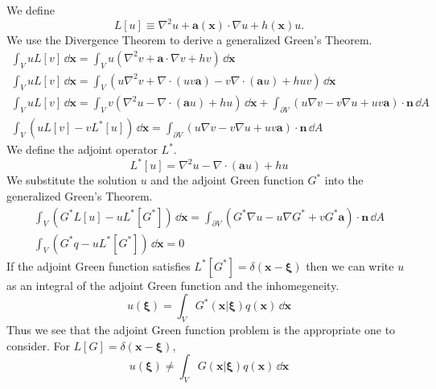 {\begin{Solution}
  We define
  \[
  L[u] \equiv \nabla^2 u + \mathbf{a}(\mathbf{x}) \cdot \nabla u + h(\mathbf{x}) u.
  \]
  We use the Divergence Theorem to derive a generalized Green's Theorem.
  \begin{gather*}
    \int_V u L[v] \,\dd \mathbf{x}
    = \int_V u ( \nabla^2 v + \mathbf{a} \cdot \nabla v + h v ) \,\dd \mathbf{x}
    \\
    \int_V u L[v] \,\dd \mathbf{x}
    = \int_V ( u \nabla^2 v + \nabla \cdot ( u v \mathbf{a} ) - v \nabla \cdot ( \mathbf{a} u ) 
    + h u v  ) \,\dd \mathbf{x}
    \\
    \int_V u L[v] \,\dd \mathbf{x}
    = \int_V v ( \nabla^2 u - \nabla \cdot ( \mathbf{a} u ) + h u ) \,\dd \mathbf{x}
    + \int_{\partial V} ( u \nabla v - v \nabla u + u v \mathbf{a} ) \cdot \mathbf{n} \,\dd A
    \\
    \int_V ( u L[v] - v L^*[u] )\,\dd \mathbf{x}
    = \int_{\partial V} ( u \nabla v - v \nabla u + u v \mathbf{a} ) \cdot \mathbf{n} \,\dd A
  \end{gather*}
  We define the adjoint operator $L^*$.
  \[
  L^*[u] = \nabla^2 u - \nabla \cdot ( \mathbf{a} u ) + h u
  \]
  We substitute the solution $u$ and the adjoint Green function $G^*$ into the 
  generalized Green's Theorem.
  \begin{gather*}
    \int_V ( G^* L[u] - u L^*[G^*] )\,\dd \mathbf{x}
    = \int_{\partial V} ( G^* \nabla u - u \nabla G^* + v G^* \mathbf{a} ) \cdot \mathbf{n} \,\dd A
    \\
    \int_V ( G^* q - u L^*[G^*] )\,\dd \mathbf{x} = 0
  \end{gather*}
  If the adjoint Green function satisfies 
  $L^*[G^*] = \delta(\mathbf{x} - \boldsymbol{\xi})$ then
  we can write $u$ as an integral of the adjoint Green function and the 
  inhomegeneity.
  \[
  u(\boldsymbol{\xi}) = \int_V G^*(\mathbf{x}|\boldsymbol{\xi}) q(\mathbf{x}) 
  \,\dd \mathbf{x}
  \]
  Thus we see that the adjoint Green function problem is the appropriate one 
  to consider.  For $L[G] = \delta(\mathbf{x} - \boldsymbol{\xi})$, 
  \[
  u(\boldsymbol{\xi}) \neq \int_V G(\mathbf{x}|\boldsymbol{\xi}) q(\mathbf{x}) 
  \,\dd \mathbf{x}
  \]
\end{Solution}









}
